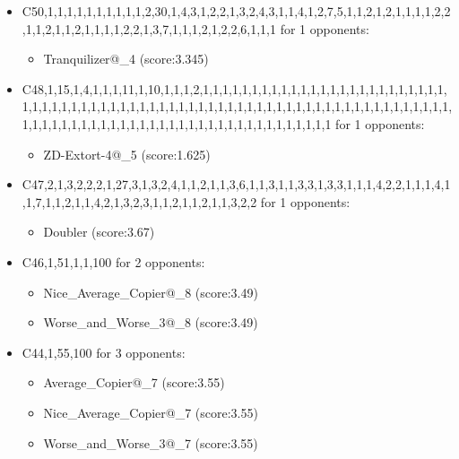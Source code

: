 \begin{appendices}
\begin{itemize}
        \item C50,1,1,1,1,1,1,1,1,1,1,2,30,1,4,3,1,2,2,1,3,2,4,3,1,1,4,1,2,7,5,1,1,2,1,2,1,1,1,1,2,2,1,1,2,1,1,2,1,1,1,1,2,2,1,3,7,1,1,1,2,1,2,2,6,1,1,1 for 1 opponents:
        \begin{multicols}{3}
            \begin{itemize}
                \item Tranquilizer@\_4 (score:3.345)
            \end{itemize}
        \end{multicols}

        \item C48,1,15,1,4,1,1,1,11,1,10,1,1,1,2,1,1,1,1,1,1,1,1,1,1,1,1,1,1,1,1,1,1,1,1,1,1,1,1,1,1,1,1,1,1,1,1,1,1,1,1,1,1,1,1,1,1,1,1,1,1,1,1,1,1,1,1,1,1,1,1,1,1,1,1,1,1,1,1,1,1,1,1,1,1,1,1,1,1,1,1,1,1,1,1,1,1,1,1,1,1,1,1,1,1,1,1,1,1,1,1,1,1,1,1,1 for 1 opponents:
        \begin{multicols}{3}
            \begin{itemize}
                \item ZD-Extort-4@\_5 (score:1.625)
            \end{itemize}
        \end{multicols}

        \item C47,2,1,3,2,2,2,1,27,3,1,3,2,4,1,1,2,1,1,3,6,1,1,3,1,1,3,3,1,3,3,1,1,1,4,2,2,1,1,1,4,1,1,7,1,1,2,1,1,4,2,1,3,2,3,1,1,2,1,1,2,1,1,3,2,2 for 1 opponents:
        \begin{multicols}{3}
            \begin{itemize}
                \item Doubler (score:3.67)
            \end{itemize}
        \end{multicols}

        \item C46,1,51,1,1,100 for 2 opponents:
        \begin{multicols}{3}
            \begin{itemize}
                \item Nice\_Average\_Copier@\_8 (score:3.49)
                \item Worse\_and\_Worse\_3@\_8 (score:3.49)
            \end{itemize}
        \end{multicols}

        \item C44,1,55,100 for 3 opponents:
        \begin{multicols}{3}
            \begin{itemize}
                \item Average\_Copier@\_7 (score:3.55)
                \item Nice\_Average\_Copier@\_7 (score:3.55)
                \item Worse\_and\_Worse\_3@\_7 (score:3.55)
            \end{itemize}
        \end{multicols}


\end{itemize}
\end{appendices}
